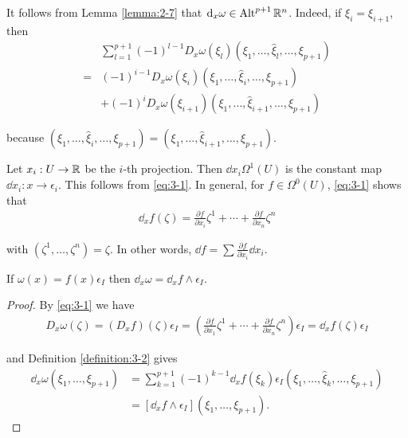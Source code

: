 It follows from Lemma \ref{lemma:2-7} that $\dd_x\omega\in\alt^{p+1}\RR^n$. Indeed, if $\xi_i = \xi_{i+1}$, then 
\begin{align*}
    &\sum_{l=1}^{p+1}\left(-1\right)^{l-1}D_{x}\omega(\xi_{l})(\xi_{1},\ldots,\hat{\xi}_{l},\ldots,\xi_{p+1}) \\
  = & (-1)^{i-1}D_{x}\omega(\xi_{i})(\xi_{1},\ldots,\hat{\xi}_{i},\ldots,\xi_{p+1}) \\
    & +(-1)^{{i}}D_{{x}}\omega(\xi_{{i+1}})(\xi_{1},\ldots,\hat{\xi}_{{i+1}},\ldots,\xi_{{p+1}})
\end{align*}


because $(\xi_1, \ldots, \hat{\xi}_i, \ldots, \xi_{p+1}) = (\xi_1, \ldots, \hat{\xi}_{i+1}, \ldots, \xi_{p+1})$.

\begin{example}\label{example:3-3}
  Let $x_i:U\to {\ensuremath{\mathbb{R}}}$ be the $i$-th projection. Then $\dd x_i \Omega^1(U)$ is the
  constant map $\dd x_i:x\to \epsilon_i$. This follows from \eqref{eq:3-1}. In general, for $f\in\Omega^0(U)$,
  \eqref{eq:3-1} shows that
  \begin{align}\label{eq:3-2}
    \dd_x f(\zeta) = \frac{\partial f }{\partial x_i }\zeta^1 + \cdots + \frac{\partial f}{\partial x_n}\zeta^n
  \end{align}

  with $(\zeta^1, \ldots, \zeta^n) = \zeta$. In other words, $\dd f = \sum{\frac{\partial f}{\partial x_i}\dd x_i}$.  
\end{example}


\begin{lemma}\label{lemma:3-4}
  If $\omega(x) = f(x)\epsilon_I$ then $\dd_x\omega = \dd_xf\wedge\epsilon_I$.
\end{lemma}

\begin{proof}
  By \eqref{eq:3-1} we have
  \begin{align*}
    D_x\omega(\zeta)
    = (D_xf)(\zeta)\epsilon_I
    = \left(\frac{\partial f}{\partial x_1}\zeta^1+\cdots+\frac{\partial f}{\partial x_n}\zeta^n\right)\epsilon_I
    = \!\dd_xf(\zeta)\epsilon_I
  \end{align*}

  and Definition \ref{definition:3-2} gives
  \begin{align*}
    \dd_{x}\omega(\xi_{1},\ldots,\xi_{p+1}) 
    & = \sum_{k=1}^{p+1}\left(-1\right)^{k-1}\dd_{x}f(\xi_{k})\epsilon_{I}\left(\xi_{1},\ldots,\hat{\xi}_{k},\ldots,\xi_{p+1}\right) \\
    & = [\dd_{x}f\wedge\epsilon_{I}](\xi_{1},\ldots,\xi_{p+1}). 
  \end{align*}
\end{proof}

